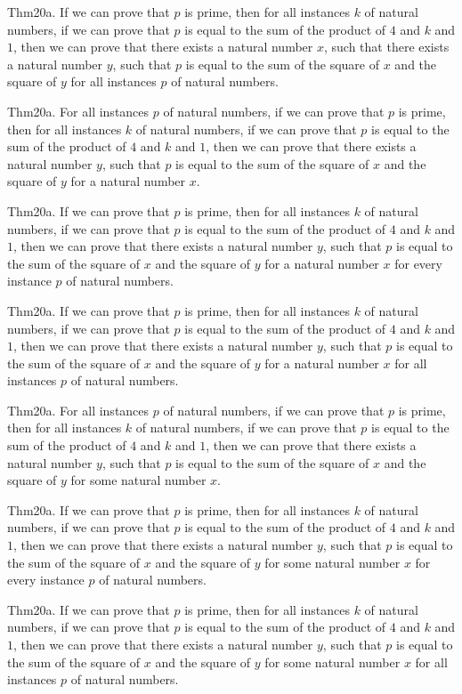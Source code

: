 \documentclass{article}
\begin{document}
Thm20a. If we can prove that $p$ is prime, then for all instances $k$ of natural numbers, if we can prove that $p$ is equal to the sum of the product of $4$ and $k$ and $1$, then we can prove that there exists a natural number $x$, such that there exists a natural number $y$, such that $p$ is equal to the sum of the square of $x$ and the square of $y$ for all instances $p$ of natural numbers.

Thm20a. For all instances $p$ of natural numbers, if we can prove that $p$ is prime, then for all instances $k$ of natural numbers, if we can prove that $p$ is equal to the sum of the product of $4$ and $k$ and $1$, then we can prove that there exists a natural number $y$, such that $p$ is equal to the sum of the square of $x$ and the square of $y$ for a natural number $x$.

Thm20a. If we can prove that $p$ is prime, then for all instances $k$ of natural numbers, if we can prove that $p$ is equal to the sum of the product of $4$ and $k$ and $1$, then we can prove that there exists a natural number $y$, such that $p$ is equal to the sum of the square of $x$ and the square of $y$ for a natural number $x$ for every instance $p$ of natural numbers.

Thm20a. If we can prove that $p$ is prime, then for all instances $k$ of natural numbers, if we can prove that $p$ is equal to the sum of the product of $4$ and $k$ and $1$, then we can prove that there exists a natural number $y$, such that $p$ is equal to the sum of the square of $x$ and the square of $y$ for a natural number $x$ for all instances $p$ of natural numbers.

Thm20a. For all instances $p$ of natural numbers, if we can prove that $p$ is prime, then for all instances $k$ of natural numbers, if we can prove that $p$ is equal to the sum of the product of $4$ and $k$ and $1$, then we can prove that there exists a natural number $y$, such that $p$ is equal to the sum of the square of $x$ and the square of $y$ for some natural number $x$.

Thm20a. If we can prove that $p$ is prime, then for all instances $k$ of natural numbers, if we can prove that $p$ is equal to the sum of the product of $4$ and $k$ and $1$, then we can prove that there exists a natural number $y$, such that $p$ is equal to the sum of the square of $x$ and the square of $y$ for some natural number $x$ for every instance $p$ of natural numbers.

Thm20a. If we can prove that $p$ is prime, then for all instances $k$ of natural numbers, if we can prove that $p$ is equal to the sum of the product of $4$ and $k$ and $1$, then we can prove that there exists a natural number $y$, such that $p$ is equal to the sum of the square of $x$ and the square of $y$ for some natural number $x$ for all instances $p$ of natural numbers.
\end{document}
